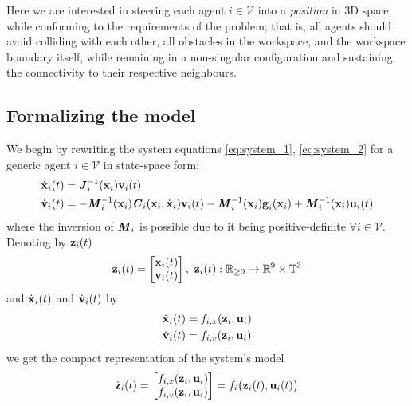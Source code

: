 Here we are interested in steering each agent $i \in \mathcal{V}$ into
a \textit{position} in 3D space, while conforming to the requirements
of the problem; that is, all agents should avoid colliding with each other, all
obstacles in the workspace, and the workspace boundary itself, while remaining
in a non-singular configuration and sustaining the connectivity to their
respective neighbours.

\subsection{Formalizing the model}

We begin by rewriting the system equations \eqref{eq:system_1},
\eqref{eq:system_2} for a generic agent $i \in \mathcal{V}$ in state-space form:
\begin{subequations}
\begin{align}
  \dot{\bm{\mathbf{x}}}_i(t) &= \bm{\mathit{J}}_i^{-1}(\bm{\mathbf{x}}_i) \bm{\mathbf{v}}_i(t) \\
  \dot{\bm{\mathbf{v}}}_i(t) &= -\bm{\mathit{M}}_i^{-1}(\bm{\mathbf{x}}_i)\bm{\mathit{C}}_i(\bm{\mathbf{x}}_i,\dot{\bm{\mathbf{x}}}_i) \bm{\mathbf{v}}_i(t)
    - \bm{\mathit{M}}_i^{-1}(\bm{\mathbf{x}}_i)\bm{\mathbf{g}}_i(\bm{\mathbf{x}}_i)
    + \bm{\mathit{M}}_i^{-1}(\bm{\mathbf{x}}_i)\bm{\mathbf{u}}_i(t)
\end{align}
\label{eq:state_space_system}
\end{subequations}
where the inversion of $\bm{\mathit{M}}_i$ is possible due to it being
positive-definite $\forall i \in \mathcal{V}$. Denoting by $\bm{\mathbf{z}}_i(t)$
\begin{align}
  \bm{\mathbf{z}}_i(t) =
    \begin{bmatrix}
      \bm{\mathbf{x}}_i(t) \\
      \bm{\mathbf{v}}_i(t) \\
    \end{bmatrix},\
    \bm{\mathbf{z}}_i(t) : \mathbb{R}_{\geq 0} \to \mathbb{R}^9 \times \mathbb{T}^3
\end{align}
and
$\dot{\bm{\mathbf{x}}}_i(t)$ and $\dot{\bm{\mathbf{v}}}_i(t)$ by
\begin{subequations}
\begin{align}
  \dot{\bm{\mathbf{x}}}_i(t) &= f_{i,x}(\bm{\mathbf{z}}_i, \bm{\mathbf{u}}_i) \\
  \dot{\bm{\mathbf{v}}}_i(t) &= f_{i,v}(\bm{\mathbf{z}}_i, \bm{\mathbf{u}}_i)
\end{align}
\end{subequations}
we get the compact representation of the system's model
\begin{align}
  \dot{\bm{\mathbf{z}}}_i(t) =
    \begin{bmatrix}
      f_{i,x}(\bm{\mathbf{z}}_i, \bm{\mathbf{u}}_i) \\
      f_{i,v}(\bm{\mathbf{z}}_i, \bm{\mathbf{u}}_i)
    \end{bmatrix} =
 f_i \big(\bm{\mathbf{z}}_i (t), \bm{\mathbf{u}}_i (t)\big)
\end{align}
